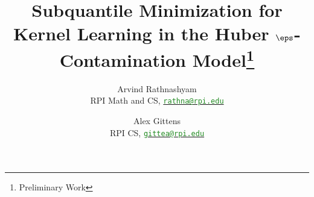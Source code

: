 \documentclass[11pt,letterpaper]{article}
\theoremstyle{plain}
\theoremstyle{definition}
\begin{document}
\begin{titlepage}
	\def\thepage{}
	\thispagestyle{empty}
	\title{Subquantile Minimization for Kernel Learning in the Huber $\eps$-Contamination Model\thanks{Preliminary Work}}
	\author{Arvind Rathnashyam\\RPI Math and CS, \href{mailto:rathna@rpi.edu}{\textcolor{ForestGreen}{\texttt{rathna@rpi.edu}}} \and Alex Gittens\\RPI CS, \href{mailto:gittea@rpi.edu}{\textcolor{ForestGreen}{\texttt{gittea@rpi.edu}}}}
	\date{}
 	\maketitle
 	
\end{titlepage}
\iffalse


	



\fi


	




\clearpage




\clearpage

\startcontents[sections]

\clearpage
\begin{appendices}
	
\clearpage
\appendix
\iffalse





\fi






%
\end{appendices}
\end{document}
